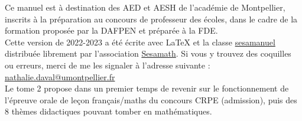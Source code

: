 

\pagebreak

Ce manuel est à destination des {\small AED} et {\small AESH} de l'académie de Montpellier, inscrits à la préparation au concours de professeur des écoles, dans le cadre de la formation proposée par la {\small DAFPEN} et préparée à la {\small FDE}. \\

Cette version de 2022-2023 a été écrite avec \LaTeX{} et la classe \href{https://www.ctan.org/pkg/sesamanuel}{\blue sesamanuel} distribuée librement par l'association \href{http://www.sesamath.net}{\blue Sesamath}. Si vous y trouvez des coquilles ou erreurs, merci de me les signaler à l'adresse suivante : \\
\href{mailto:nathalie.daval@umontpellier.fr}{nathalie.daval@umontpellier.fr} \\

Le tome 2 propose dans un premier temps de revenir sur le fonctionnement de l'épreuve orale de leçon français/maths du concours {\small CRPE} (admission), puis des 8 thèmes didactiques pouvant tomber en mathématiques.

